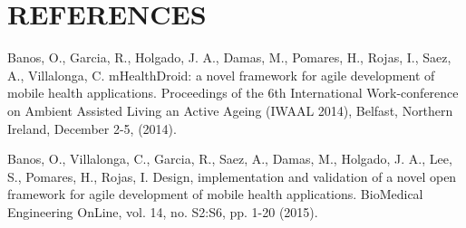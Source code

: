 \documentclass[acmtog]{acmart}
\begin{document}
\section{REFERENCES}
Banos, O., Garcia, R., Holgado, J. A., Damas, M., Pomares, H., Rojas, I., Saez, A., Villalonga, C. mHealthDroid: a novel framework for agile development of mobile health applications. Proceedings of the 6th International Work-conference on Ambient Assisted Living an Active Ageing (IWAAL 2014), Belfast, Northern Ireland, December 2-5, (2014).

Banos, O., Villalonga, C., Garcia, R., Saez, A., Damas, M., Holgado, J. A., Lee, S., Pomares, H., Rojas, I. Design, implementation and validation of a novel open framework for agile development of mobile health applications. BioMedical Engineering OnLine, vol. 14, no. S2:S6, pp. 1-20 (2015).
\end{document}
